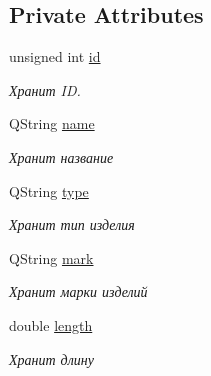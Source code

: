 \subsection*{Private Attributes}
\begin{DoxyCompactItemize}
\item 
\mbox{\label{class_data_a1038027623494cd8010c2da6dc4931cf}} 
unsigned int \mbox{\hyperlink{class_data_a1038027623494cd8010c2da6dc4931cf}{id}}
\begin{DoxyCompactList}\small\item\em Хранит ID. \end{DoxyCompactList}\item 
\mbox{\label{class_data_a26474da0b1d12f2c859c3f5c1b0319cd}} 
Q\+String \mbox{\hyperlink{class_data_a26474da0b1d12f2c859c3f5c1b0319cd}{name}}
\begin{DoxyCompactList}\small\item\em Хранит название \end{DoxyCompactList}\item 
\mbox{\label{class_data_af9f18d58205e8ffe53ef3ebd7142df39}} 
Q\+String \mbox{\hyperlink{class_data_af9f18d58205e8ffe53ef3ebd7142df39}{type}}
\begin{DoxyCompactList}\small\item\em Хранит тип изделия \end{DoxyCompactList}\item 
\mbox{\label{class_data_ac42443978dbd444351eaa3411dd2eb29}} 
Q\+String \mbox{\hyperlink{class_data_ac42443978dbd444351eaa3411dd2eb29}{mark}}
\begin{DoxyCompactList}\small\item\em Хранит марки изделий \end{DoxyCompactList}\item 
\mbox{\label{class_data_a99618bdc2d9259373ecdf185f75caabf}} 
double \mbox{\hyperlink{class_data_a99618bdc2d9259373ecdf185f75caabf}{length}}
\begin{DoxyCompactList}\small\item\em Хранит длину \end{DoxyCompactList}\item 
\mbox{\label{class_data_ae7a24cb64fc28f87f3b2cd1b0a447d25}} 

\end{DoxyCompactItemize}
